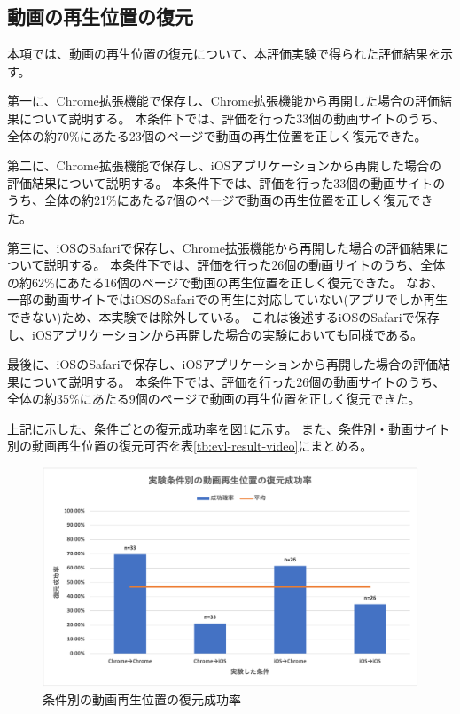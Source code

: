 \subsection{動画の再生位置の復元}
本項では、動画の再生位置の復元について、本評価実験で得られた評価結果を示す。

第一に、Chrome拡張機能で保存し、Chrome拡張機能から再開した場合の評価結果について説明する。
本条件下では、評価を行った33個の動画サイトのうち、全体の約70\%にあたる23個のページで動画の再生位置を正しく復元できた。

第二に、Chrome拡張機能で保存し、iOSアプリケーションから再開した場合の評価結果について説明する。
本条件下では、評価を行った33個の動画サイトのうち、全体の約21\%にあたる7個のページで動画の再生位置を正しく復元できた。

第三に、iOSのSafariで保存し、Chrome拡張機能から再開した場合の評価結果について説明する。
本条件下では、評価を行った26個の動画サイトのうち、全体の約62\%にあたる16個のページで動画の再生位置を正しく復元できた。
なお、一部の動画サイトではiOSのSafariでの再生に対応していない(アプリでしか再生できない)ため、本実験では除外している。
これは後述するiOSのSafariで保存し、iOSアプリケーションから再開した場合の実験においても同様である。

最後に、iOSのSafariで保存し、iOSアプリケーションから再開した場合の評価結果について説明する。
本条件下では、評価を行った26個の動画サイトのうち、全体の約35\%にあたる9個のページで動画の再生位置を正しく復元できた。

上記に示した、条件ごとの復元成功率を図\ref{fig:success-rate-video}に示す。
また、条件別・動画サイト別の動画再生位置の復元可否を表\ref{tb:evl-result-video}にまとめる。

\begin{figure}[htbp]
  \label{fig:success-rate-video}
  \begin{center}
    \includegraphics[bb=0 0 530.6 309.8,width=15cm]{img/060_evaluation/result/video/success-rate-video.pdf}
  \end{center}
  \caption{条件別の動画再生位置の復元成功率}
\end{figure}

